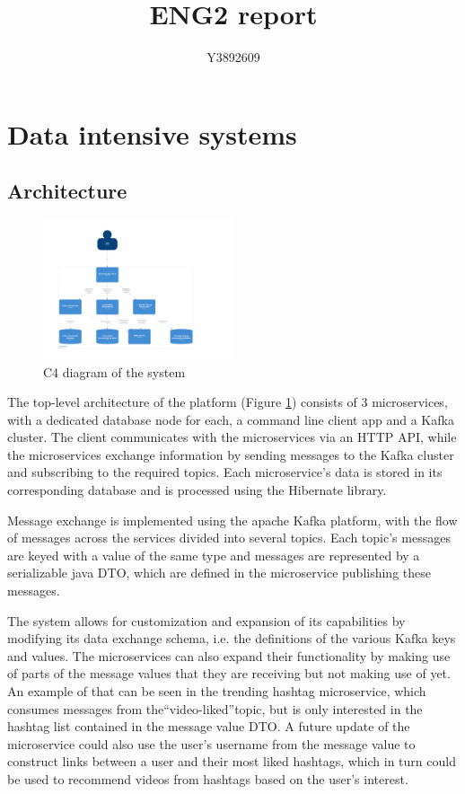 \documentclass[parskip=full]{article}
\begin{document}
    \title{ENG2 report}
    \author{Y3892609}
    \maketitle
    \tableofcontents
    \pagebreak
    \section{Data intensive systems}
    \subsection{Architecture}
    \begin{figure}
    \includegraphics[width=0.5\textwidth]{c4-diagram-top-level}
    \caption{C4 diagram of the system}
    \label{fig:c4Diagram}
    \end{figure}

    The top-level architecture of the platform (Figure \ref{fig:c4Diagram}) consists of 3 microservices, with a dedicated database node for each, a command line client app and a Kafka cluster.
    The client communicates with the microservices via an HTTP API, while the microservices exchange information by sending messages to the Kafka cluster and subscribing to the required topics.
    Each microservice's data is stored in its corresponding database and is processed using the Hibernate library.

    Message exchange is implemented using the apache Kafka platform, with the flow of messages across the services divided into several topics.
    Each topic's messages are keyed with a value of the same type and messages are represented by a serializable java DTO, which are defined in the microservice publishing these messages.

    The system allows for customization and expansion of its capabilities by modifying its data exchange schema, i.e. the definitions of the various Kafka keys and values.
    The microservices can also expand their functionality by making use of parts of the message values that they are receiving but not making use of yet.
    An example of that can be seen in the trending hashtag microservice, which consumes messages from the``video-liked''topic, but is only interested in the hashtag list contained in the message value DTO. A future update of the microservice could also use the user's username from the message value to construct links between a user and their most liked hashtags, which in turn could be used to recommend videos from hashtags based on the user's interest.
\end{document}

